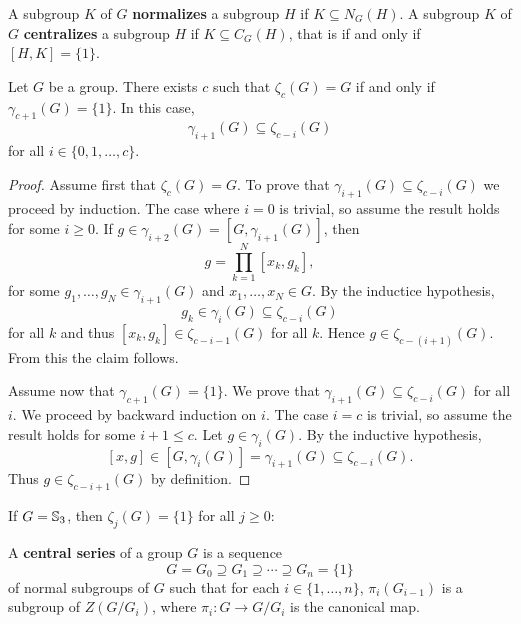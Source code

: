 A subgroup $K$ of $G$ \textbf{normalizes} a subgroup 
$H$ if $K\subseteq N_G(H)$.
A subgroup $K$ of $G$ \textbf{centralizes} a subgroup 
$H$ if $K\subseteq C_G(H)$, that is if and only if $[H,K]=\{1\}$.

\begin{lemma}
	\label{lem:gamma_zeta}
	Let $G$ be a group. There exists $c$ such that $\zeta_c(G)=G$ if and only if 
	$\gamma_{c+1}(G)=\{1\}$. In this case,  
	\[
	\gamma_{i+1}(G)\subseteq\zeta_{c-i}(G)
	\]
	for all $i\in\{0,1,\dots,c\}$. 
\end{lemma}

\begin{proof}
	Assume first that $\zeta_c(G)=G$. To prove that 
    $\gamma_{i+1}(G)\subseteq\zeta_{c-i}(G)$ we proceed by induction. The case where $i=0$ is
	trivial, so assume the result holds for some $i\geq0$. If
	$g\in\gamma_{i+2}(G)=[G,\gamma_{i+1}(G)]$, then   
	\[
	g=\prod_{k=1}^N [x_k,g_k],
	\]
	for some $g_1,\dots,g_N\in\gamma_{i+1}(G)$ and $x_1,\dots,x_N\in G$. By the inductice hypothesis, 
	\[
	g_k\in\gamma_i(G)\subseteq\zeta_{c-i}(G)
	\]
	for all $k$ and thus $[x_k,g_k]\in\zeta_{c-i-1}(G)$ for all $k$. Hence 
	$g\in\zeta_{c-(i+1)}(G)$. From this the claim follows.
	
	Assume now that $\gamma_{c+1}(G)=\{1\}$. We prove that 
	$\gamma_{i+1}(G)\subseteq\zeta_{c-i}(G)$ for all $i$. We proceed by backward induction on $i$. 
	The case $i=c$ is trivial, so assume the
	result holds for some $i+1\leq c$. Let $g\in\gamma_{i}(G)$. By the inductive hypothesis, 
	\[
	[x,g]\in [G,\gamma_i(G)]=\gamma_{i+1}(G)\subseteq\zeta_{c-i}(G).
	\]
	Thus $g\in\zeta_{c-i+1}(G)$ by definition. 
\end{proof}

\begin{example}
	If $G=\mathbb{S}_3$, then $\zeta_j(G)=\{1\}$ for all $j\geq 0$: 
\end{example}

A \textbf{central series} of a group $G$ is a sequence
\[
	G=G_0\supseteq G_1\supseteq\cdots\supseteq G_n=\{1\}
\]
of normal subgroups of $G$ such that for each $i\in\{1,\dots,n\}$, 
$\pi_i(G_{i-1})$ is a subgroup of $Z(G/G_i)$, where $\pi_i\colon G\to
G/G_i$ is the canonical map. 

